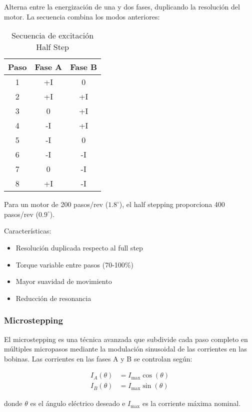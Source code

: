 Alterna entre la energización de una y dos fases, duplicando la resolución del motor. La secuencia combina los modos anteriores:

\begin{table}[ht]
\centering
\begin{tabular}{|c|c|c|}
\hline
\textbf{Paso} & \textbf{Fase A} & \textbf{Fase B} \\
\hline
1 & +I & 0 \\
2 & +I & +I \\
3 & 0 & +I \\
4 & -I & +I \\
5 & -I & 0 \\
6 & -I & -I \\
7 & 0 & -I \\
8 & +I & -I \\
\hline
\end{tabular}
\caption{Secuencia de excitación Half Step}
\end{table}

Para un motor de 200 pasos/rev ($1.8^\circ$), el half stepping proporciona 400 pasos/rev ($0.9^\circ$).

Características:
\begin{itemize}[label=$\bullet$]
    \item Resolución duplicada respecto al full step
    \item Torque variable entre pasos (70-100\%)
    \item Mayor suavidad de movimiento
    \item Reducción de resonancia
\end{itemize}

\subsubsection{Microstepping}

El microstepping es una técnica avanzada que subdivide cada paso completo en múltiples micropasos mediante la modulación sinusoidal de las corrientes en las bobinas. Las corrientes en las fases A y B se controlan según:

\begin{equation}
\begin{aligned}
I_A(\theta) &= I_{\max} \cos(\theta) \\
I_B(\theta) &= I_{\max} \sin(\theta)
\end{aligned}
\end{equation}

donde $\theta$ es el ángulo eléctrico deseado e $I_{\max}$ es la corriente máxima nominal.

